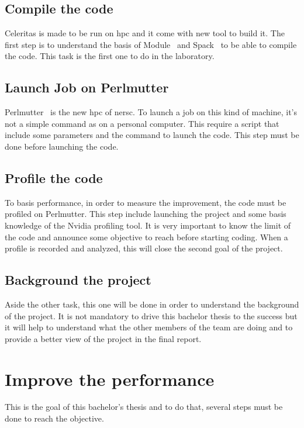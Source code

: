 \subsection{Compile the code}
\label{spec:ch:activities:understand-the-project:compile-the-code}
Celeritas is made to be run on \acrshort{hpc} and it come with new tool to build it.
The first step is to understand the basis of Module~\cite{Module} and Spack~\cite{Spack} to be able to compile the code.
This task is the first one to do in the laboratory.


\subsection{Launch Job on Perlmutter}
\label{spec:ch:activities:understand-the-project:launch-job-on-perlmutter}
Perlmutter~\cite{Perlmutter} is the new \acrshort{hpc} of \acrshort{nersc}.
To launch a job on this kind of machine, it's not a simple command as on a personal computer.
This require a script that include some parameters and the command to launch the code.
This step must be done before launching the code.


\subsection{Profile the code}
\label{specspec:ch:activities:understand-the-project:profile-the-code}
To basis performance, in order to measure the improvement, the code must be profiled on Perlmutter.
This step include launching the project and some basis knowledge of the Nvidia profiling tool.
It is very important to know the limit of the code and announce some objective to reach before starting coding.
When a profile is recorded and analyzed, this will close the second goal of the project.


\subsection{Background the project}
\label{spec:ch:activities:understand-the-project:background-the-project}
Aside the other task, this one will be done in order to understand the background of the project.
It is not mandatory to drive this bachelor thesis to the success but it will help to understand what the other members of the team are doing and to provide a better view of the project in the final report.



\section{Improve the performance}
\label{spec:ch:activities:improve-the-performance}
This is the goal of this bachelor's thesis and to do that, several steps must be done to reach the objective.


